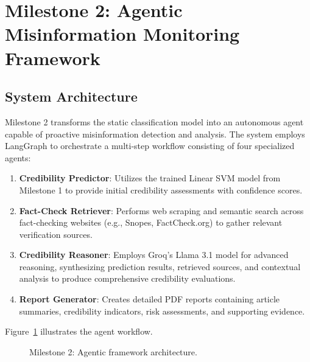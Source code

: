 \documentclass[conference]{IEEEtran}
\begin{document}
\section{Milestone 2: Agentic Misinformation Monitoring Framework}

\subsection{System Architecture}

Milestone 2 transforms the static classification model into an autonomous agent capable of proactive misinformation detection and analysis. The system employs LangGraph to orchestrate a multi-step workflow consisting of four specialized agents:

\begin{enumerate}
    \item \textbf{Credibility Predictor}: Utilizes the trained Linear SVM model from Milestone 1 to provide initial credibility assessments with confidence scores.
    \item \textbf{Fact-Check Retriever}: Performs web scraping and semantic search across fact-checking websites (e.g., Snopes, FactCheck.org) to gather relevant verification sources.
    \item \textbf{Credibility Reasoner}: Employs Groq's Llama 3.1 model for advanced reasoning, synthesizing prediction results, retrieved sources, and contextual analysis to produce comprehensive credibility evaluations.
    \item \textbf{Report Generator}: Creates detailed PDF reports containing article summaries, credibility indicators, risk assessments, and supporting evidence.
\end{enumerate}

Figure~\ref{fig:agent_architecture} illustrates the agent workflow.

\begin{figure}[ht]
\centering
{}
\caption{Milestone 2: Agentic framework architecture.}
\label{fig:agent_architecture}
\end{figure}
\end{document}
